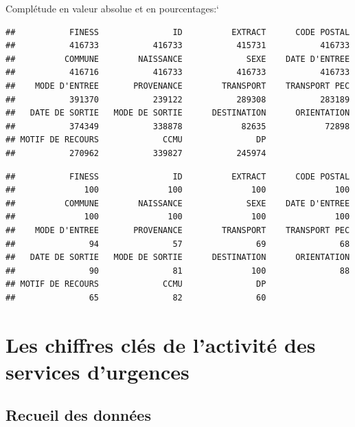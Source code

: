 \documentclass[]{article}
\begin{document}
Complétude en valeur absolue et en pourcentages:`

\begin{verbatim}
##           FINESS               ID          EXTRACT      CODE POSTAL 
##           416733           416733           415731           416733 
##          COMMUNE        NAISSANCE             SEXE    DATE D'ENTREE 
##           416716           416733           416733           416733 
##    MODE D'ENTREE       PROVENANCE        TRANSPORT    TRANSPORT PEC 
##           391370           239122           289308           283189 
##   DATE DE SORTIE   MODE DE SORTIE      DESTINATION      ORIENTATION 
##           374349           338878            82635            72898 
## MOTIF DE RECOURS             CCMU               DP 
##           270962           339827           245974
\end{verbatim}

\begin{verbatim}
##           FINESS               ID          EXTRACT      CODE POSTAL 
##              100              100              100              100 
##          COMMUNE        NAISSANCE             SEXE    DATE D'ENTREE 
##              100              100              100              100 
##    MODE D'ENTREE       PROVENANCE        TRANSPORT    TRANSPORT PEC 
##               94               57               69               68 
##   DATE DE SORTIE   MODE DE SORTIE      DESTINATION      ORIENTATION 
##               90               81              100               88 
## MOTIF DE RECOURS             CCMU               DP 
##               65               82               60
\end{verbatim}

\section{Les chiffres clés de l'activité des services
d'urgences}\label{les-chiffres-cles-de-lactivite-des-services-durgences}

\subsection{Recueil des données}\label{recueil-des-donnees}
\end{document}
